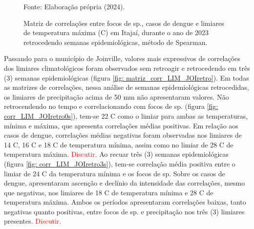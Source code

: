 \documentclass[
	12pt,				%
	openright,			%
	oneside,			%
	a4paper,			%
	english,			%
	french,				%
	spanish,			%
	brazil				%
	dvipsnames, table]{abntex2}
\begin{document}
\begin{figure}[htbp]
    \begin{center}
    \caption{Matriz de correlações entre focos de  sp., casos de dengue e limiares de temperatura máxima (C) em Itajaí, durante o ano de 2023 retrocedendo semanas epidemiológicas, método de Spearman.}
    \label{fig: matriz_corr_LIMtmax_ITA}
        \hfill
    \end{center}
    \small{Fonte: Elaboração própria (2024).}
\end{figure}


Passando para o município de Joinville, valores mais expressivos de correlações dos limiares climatológicos foram observados sem retroagir e retrocedendo em três (3) semanas epidemiológicas (figura \ref{fig: matriz_corr_LIM_JOIretro}). Em todas as matrizes de correlações, nessa análise de semanas epidemiológicas retrocedidas, os limiares de precipitação acima de 50 mm não apresentaram valores. Não retrocendendo no tempo e correlacionando com focos de  sp. (figura \ref{fig: corr_LIM_JOIretro0s}), tem-se 22 C como o limiar para ambas as temperaturas, mínima e máxima, que apresenta correlações médias positivas. Em relação aos casos de dengue, correlações médias negativas foram observadas nos limiares de 14 C, 16 C e 18 C de temperatura mínima, assim como no limiar de 28 C de temperatura máxima. \textcolor{red}{Discutir.} Ao recuar três (3) semanas epidemiológicas (figura \ref{fig: corr_LIM_JOIretro3s}), tem-se correlação média positiva entre o limiar de 24 C da temperatura mínima e os focos de  sp. Sobre os casos de dengue, apresentaram ascenção e declínio da intensidade das correlações, mesmo que negativas, nos limiares de 18 C de temperatura mínima e 28 C de temperatura máxima. Ambos os períodos apresentaram correlações baixas, tanto negativas quanto positivas, entre focos de  sp. e precipitação nos três (3) limiares presentes. \textcolor{red}{Discutir.}
\end{document}

